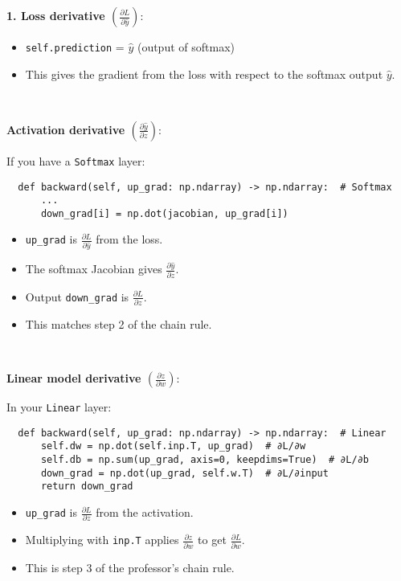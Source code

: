 \documentclass{article}
\newenvironment{cheatformula}[1][כותרת]{
    \begin{minipage}{\linewidth}
    \textbf{#1}:
}{
    \end{minipage}\\[0ex]
}
\begin{document}
\begin{multicols*}{2}
\begin{cheatformula}[1. Loss derivative $\left(\frac{\partial L}{\partial \hat{y}}\right)$]
  \begin{itemize}
      \item \texttt{self.prediction} = $\hat{y}$ (output of softmax)
      \item This gives the gradient from the loss with respect to the softmax output $\hat{y}$.
  \end{itemize}
  \end{cheatformula}
  
  \begin{cheatformula}[Activation derivative $\left(\frac{\partial \hat{y}}{\partial z}\right)$]
  If you have a \texttt{Softmax} layer:
  
  \begin{lstlisting}
  def backward(self, up_grad: np.ndarray) -> np.ndarray:  # Softmax
      ...
      down_grad[i] = np.dot(jacobian, up_grad[i])
  \end{lstlisting}
  
  \begin{itemize}
      \item \texttt{up\_grad} is $\frac{\partial L}{\partial \hat{y}}$ from the loss.
      \item The softmax Jacobian gives $\frac{\partial \hat{y}}{\partial z}$.
      \item Output \texttt{down\_grad} is $\frac{\partial L}{\partial z}$.
      \item This matches step 2 of the chain rule.
  \end{itemize}
  \end{cheatformula}
  
  \begin{cheatformula}[Linear model derivative $\left(\frac{\partial z}{\partial w}\right)$]
  In your \texttt{Linear} layer:
  
  \begin{lstlisting}
  def backward(self, up_grad: np.ndarray) -> np.ndarray:  # Linear
      self.dw = np.dot(self.inp.T, up_grad)  # ∂L/∂w
      self.db = np.sum(up_grad, axis=0, keepdims=True)  # ∂L/∂b
      down_grad = np.dot(up_grad, self.w.T)  # ∂L/∂input
      return down_grad
  \end{lstlisting}
  
  \begin{itemize}
      \item \texttt{up\_grad} is $\frac{\partial L}{\partial z}$ from the activation.
      \item Multiplying with \texttt{inp.T} applies $\frac{\partial z}{\partial w}$ to get $\frac{\partial L}{\partial w}$.
      \item This is step 3 of the professor’s chain rule.
  \end{itemize}


\end{cheatformula}
\end{multicols*}
\end{document}
